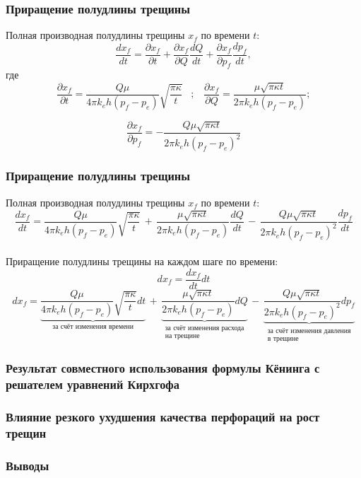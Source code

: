 \documentclass{beamer}
\begin{document}
\begin{frame}
\frametitle{Приращение полудлины трещины}

Полная производная полудлины трещины $x_{\!f}$ по времени $t$:
$$
\frac{dx_{\!f}}{dt}=\frac{\partial x_{\!f}}{\partial t}+\frac{\partial x_{\!f}}{\partial Q}\frac{dQ}{dt}+\frac{\partial x_{\!f}}{\partial p_{\!f}}\frac{dp_{\!f}}{dt},
$$
где
$$
\frac{\partial x_{\!f}}{\partial t}=\frac{Q\mu}{4\pi k_eh\left(p_{\!f}-p_e\right)}\sqrt{\frac{\pi\kappa}{t}}\,\,\,\,\,;\,\,\,\,\,\frac{\partial x_{\!f}}{\partial Q}=\frac{\mu\sqrt{\pi\kappa t}}{2\pi k_eh\left(p_{\!f}-p_e\right)};
$$

$$
\frac{\partial x_{\!f}}{\partial p_{\!f}}=-\frac{Q\mu\sqrt{\pi\kappa t}}{2\pi k_eh\left(p_{\!f}-p_e\right)^2}
$$
\end{frame}


\begin{frame}
\frametitle{Приращение полудлины трещины}

Полная производная полудлины трещины $x_{\!f}$ по времени $t$:
\small
$$
\frac{dx_{\!f}}{dt}=\frac{Q\mu}{4\pi k_eh\left(p_{\!f}-p_e\right)}\sqrt{\frac{\pi\kappa}{t}}\,+\,\frac{\mu\sqrt{\pi\kappa t}}{2\pi k_eh\left(p_{\!f}-p_e\right)}\frac{dQ}{dt}\,-\,\frac{Q\mu\sqrt{\pi\kappa t}}{2\pi k_eh\left(p_{\!f}-p_e\right)^2}\frac{dp_{\!f}}{dt}
$$
\normalsize
\ \\

Приращение полудлины трещины на каждом шаге по времени:
$$
dx_{\!f}=\frac{dx_{\!f}}{dt}dt
$$
\small
$$
dx_{\!f}=\underbrace{\frac{Q\mu}{4\pi k_eh\left(p_{\!f}-p_e\right)}\sqrt{\frac{\pi\kappa}{t}}dt}_{\text{за счёт изменения времени}}\,+\,\underbrace{\frac{\mu\sqrt{\pi\kappa t}}{2\pi k_eh\left(p_{\!f}-p_e\right)}dQ}_{\substack{\text{за счёт изменения расхода}\\\text{на трещине}}}\,-\,\underbrace{\frac{Q\mu\sqrt{\pi\kappa t}}{2\pi k_eh\left(p_{\!f}-p_e\right)^2}dp_{\!f}}_{\substack{\text{за счёт изменения давления}\\\text{в трещине}}}
$$
\normalsize

\end{frame}


\begin{frame}
\frametitle{Результат совместного использования формулы Кёнинга с решателем уравнений Кирхгофа}


\end{frame}

\begin{frame}
\frametitle{Влияние резкого ухудшения качества перфораций на рост трещин}

\end{frame}

\begin{frame}
\frametitle{Выводы}

\end{frame}
\end{document}
